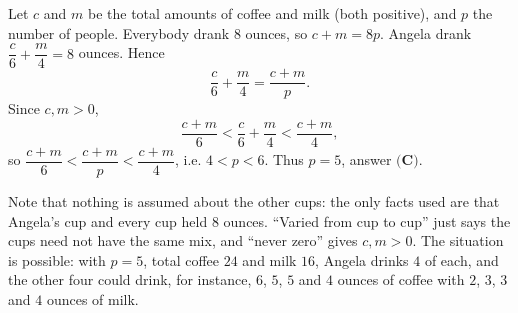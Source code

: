 Let $c$ and $m$ be the total amounts of coffee and milk (both positive), and $p$ the number of people. Everybody drank $8$ ounces, so $c+m=8p$. Angela drank $\dfrac c6+\dfrac m4=8$ ounces. Hence
\[\dfrac c6+\dfrac m4=\dfrac{c+m}{p}.\]
Since $c,m>0$,
\[\dfrac{c+m}{6}<\dfrac c6+\dfrac m4<\dfrac{c+m}{4},\]
so $\dfrac{c+m}{6}<\dfrac{c+m}{p}<\dfrac{c+m}{4}$, i.e. $4<p<6$. Thus $p=\boxed{5}$, answer $\textbf{(C)}$.

Note that nothing is assumed about the other cups: the only facts used are that Angela's cup and every cup held $8$ ounces. ``Varied from cup to cup'' just says the cups need not have the same mix, and ``never zero'' gives $c,m>0$. The situation is possible: with $p=5$, total coffee $24$ and milk $16$, Angela drinks $4$ of each, and the other four could drink, for instance, $6$, $5$, $5$ and $4$ ounces of coffee with $2$, $3$, $3$ and $4$ ounces of milk.
